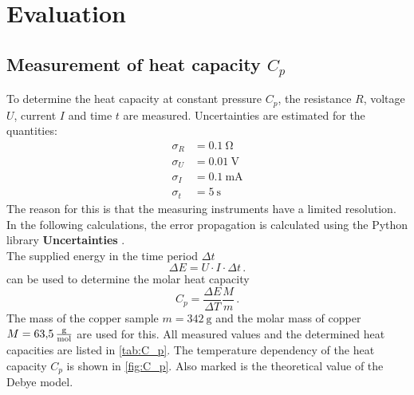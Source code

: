 \section{Evaluation}
\label{sec:evaluation}

\subsection{Measurement of heat capacity $C_p$}
To determine the heat capacity at constant pressure $C_p$, the resistance $R$, voltage $U$, current $I$ and time $t$ are measured.
Uncertainties are estimated for the quantities:
\begin{align*}
    \sigma_R &= \qty{0.1}{\ohm} \\
    \sigma_U &= \qty{0.01}{\volt}\\
    \sigma_I &= \qty{0.1}{\milli\ampere} \\
    \sigma_t &= \qty{5}{\second}
\end{align*}
The reason for this is that the measuring instruments have a limited resolution.
In the following calculations, the error propagation is calculated using the Python library \textbf{Uncertainties} \cite{uncertainties}.
\\
The supplied energy in the time period $\Delta t$
\begin{equation}
    \Delta E = U \cdot I \cdot \Delta t \, .
\end{equation}
can be used to determine the molar heat capacity
\begin{equation}
    C_p = \frac{\Delta E}{\Delta T} \frac{M}{m} \,.
\end{equation}
The mass of the copper sample $m = \qty{342}{\gram}$ \cite{V47} and the molar mass of copper $M = \qty{63.5}{\frac{\gram}{\mol}}$ \cite{goodfellow} are used for this.
All measured values and the determined heat capacities are listed in \autoref{tab:C_p}.
The temperature dependency of the heat capacity $C_p$ is shown in \autoref{fig:C_p}.
Also marked is the theoretical value of the Debye model. %
